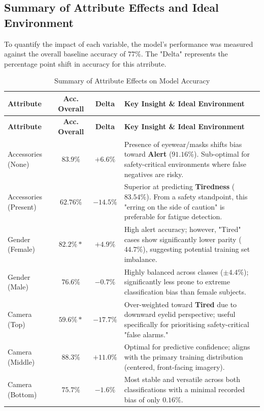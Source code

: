 \subsection{Summary of Attribute Effects and Ideal Environment}
To quantify the impact of each variable, the model's performance was measured against the overall baseline accuracy of $77\%$. The "Delta" represents the percentage point
shift in accuracy for this atrribute.

\begin{landscape}
\renewcommand{\arraystretch}{1.3} %
\begin{xltabular}{\linewidth}{@{} l c c X @{}}
\caption{Summary of Attribute Effects on Model Accuracy} \label{tab:attr_summary} \\
\toprule
    \textbf{Attribute} & \textbf{Acc. Overall} & \textbf{Delta} & \textbf{Key Insight \& Ideal Environment} \\
\midrule
\endfirsthead

\toprule
    \textbf{Attribute} & \textbf{Acc. Overall} & \textbf{Delta} & \textbf{Key Insight \& Ideal Environment} \\
\midrule
\endhead

Accessories (None)    & $83.9\%$  & $+6.6\%$  & Presence of eyewear/masks shifts bias toward \textbf{Alert} ($91.16\%$). Sub-optimal for safety-critical environments where false negatives are risky. \\ \addlinespace
Accessories (Present) & $62.76\%$ & $-14.5\%$ & Superior at predicting \textbf{Tiredness} ($83.54\%$). From a safety standpoint, this "erring on the side of caution" is preferable for fatigue detection. \\ \midrule

Gender (Female)       & $82.2\%*$ & $+4.9\%$  & High alert accuracy; however, "Tired" cases show significantly lower parity ($44.7\%$), suggesting potential training set imbalance. \\ \addlinespace
Gender (Male)         & $76.6\%$  & $-0.7\%$  & Highly balanced across classes ($\pm 4.4\%$); significantly less prone to extreme classification bias than female subjects. \\ \midrule

Camera (Top)          & $59.6\%*$ & $-17.7\%$ & Over-weighted toward \textbf{Tired} due to downward eyelid perspective; useful specifically for prioritising safety-critical "false alarms." \\ \addlinespace
Camera (Middle)       & $88.3\%$  & $+11.0\%$ & Optimal for predictive confidence; aligns with the primary training distribution (centered, front-facing imagery). \\ \addlinespace
Camera (Bottom)       & $75.7\%$  & $-1.6\%$  & Most stable and versatile across both classifications with a minimal recorded bias of only $0.16\%$. \\ \midrule


\end{xltabular}
\end{landscape}
